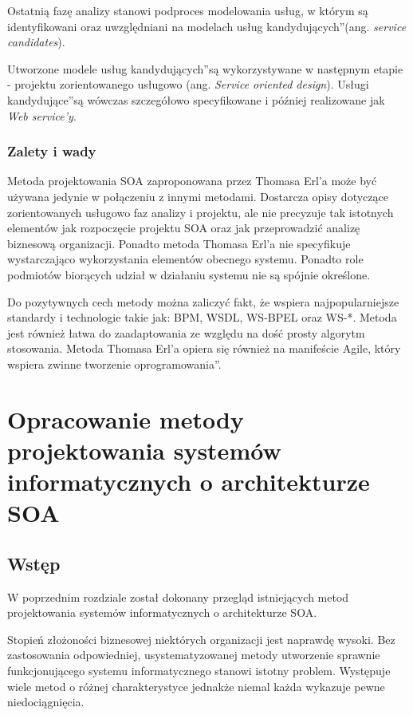 Ostatnią fazę analizy stanowi podproces modelowania usług, w którym są identyfikowani oraz uwzględniani na modelach \quotedblbase usług kandydujących\textquotedblright (ang. \emph{service candidates}). \cite{CompSOAMet}

Utworzone modele \quotedblbase usług kandydujących\textquotedblright są wykorzystywane w następnym etapie - projektu zorientowanego usługowo (ang. \emph{Service oriented design}). \quotedblbase Usługi kandydujące\textquotedblright są wówczas szczegółowo specyfikowane i później realizowane jak \emph{Web service'y}.


\subsection{Zalety i wady}
Metoda projektowania SOA zaproponowana przez Thomasa Erl'a może być używana jedynie w połączeniu z innymi metodami. Dostarcza opisy dotyczące zorientowanych usługowo faz analizy i projektu, ale nie precyzuje tak istotnych elementów jak rozpoczęcie projektu SOA oraz jak przeprowadzić analizę biznesową organizacji. Ponadto metoda Thomasa Erl'a nie specyfikuje wystarczająco wykorzystania elementów obecnego systemu. Ponadto role podmiotów biorących udział w działaniu systemu nie są spójnie określone.

Do pozytywnych cech metody można zaliczyć fakt, że wspiera najpopularniejsze standardy i technologie takie jak: BPM, WSDL, WS-BPEL oraz WS-*. Metoda jest również łatwa do zaadaptowania ze względu na dość prosty algorytm stosowania. Metoda Thomasa Erl'a opiera się również na manifeście Agile, który wspiera \quotedblbase zwinne tworzenie oprogramowania\textquotedblright. \cite{OffCompSOAM, RamErvSOA}

\chapter{Opracowanie metody projektowania systemów informatycznych o architekturze SOA}
\section{Wstęp}
W poprzednim rozdziale został dokonany przegląd istniejących metod projektowania systemów informatycznych o architekturze SOA.

Stopień złożoności biznesowej niektórych organizacji jest naprawdę wysoki. Bez zastosowania odpowiedniej, usystematyzowanej metody utworzenie sprawnie funkcjonującego systemu informatycznego stanowi istotny problem. Występuje wiele metod o różnej charakterystyce jednakże niemal każda wykazuje pewne niedociągnięcia.

